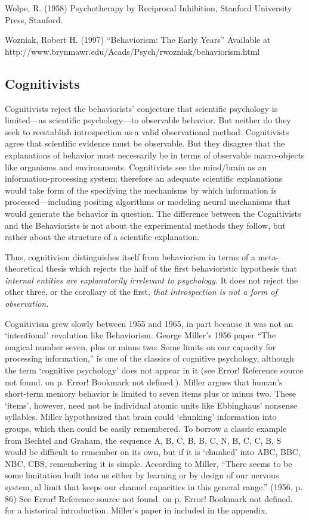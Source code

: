 Wolpe, R. (1958) Psychotherapy by Reciprocal Inhibition, Stanford University Press, Stanford.

Wozniak, Robert H. (1997) “Behaviorism: The Early Years” Available at http:\slash \slash www.brynmawr.edu\slash Acads\slash Psych\slash rwozniak\slash behaviorism.html

\subsection{Cognitivists}
\label{cognitivists}

Cognitivists reject the behaviorists' conjecture that scientific psychology is limited—as scientific psychology—to observable behavior. But neither do they seek to reestablish introspection as a valid observational method. Cognitivists agree that scientific evidence must be observable. But they disagree that the explanations of behavior must necessarily be in terms of observable macro-objects like organisms and environments. Cognitivists see the mind\slash brain as an information-processing system; therefore an adequate scientific explanations would take form of the specifying the mechanisms by which information is processed—including positing algorithms or modeling neural mechanisms that would generate the behavior in question. The difference between the Cognitivists and the Behaviorists is not about the experimental methods they follow, but rather about the structure of a scientific explanation.

Thus, cognitivism distinguishes itself from behaviorism in terms of a meta-theoretical thesis which rejects the half of the first behavioristic hypothesis that \emph{internal entities are explanatorily irrelevant to psychology.} It does not reject the other three, or the corollary of the first, \emph{that introspection is not a form of observation.}

Cognitivism grew slowly between 1955 and 1965, in part because it was not an `intentional' revolution like Behaviorism. George Miller's 1956 paper “The magical number seven, plus or minus two: Some limits on our capacity for processing information,” is one of the classics of cognitive psychology, although the term `cognitive psychology' does not appear in it (see Error! Reference source not found. on p. Error! Bookmark not defined.). Miller argues that human's short-term memory behavior is limited to seven items plus or minus two. These `items', however, need not be individual atomic units like Ebbinghaus' nonsense syllables. Miller hypothesized that brain could `chunking' information into groups, which then could be easily remembered. To borrow a classic example from Bechtel and Graham, the sequence A, B, C, B, B, C, N, B, C, C, B, S would be difficult to remember on its own, but if it is `chunked' into ABC, BBC, NBC, CBS, remembering it is simple. According to Miller, “There seems to be some limitation built into us either by learning or by design of our nervous system, al limit that keeps our channel capacities in this general range.” (1956, p. 86) See Error! Reference source not found. on p. Error! Bookmark not defined. for a historical introduction. Miller's paper in included in the appendix.

